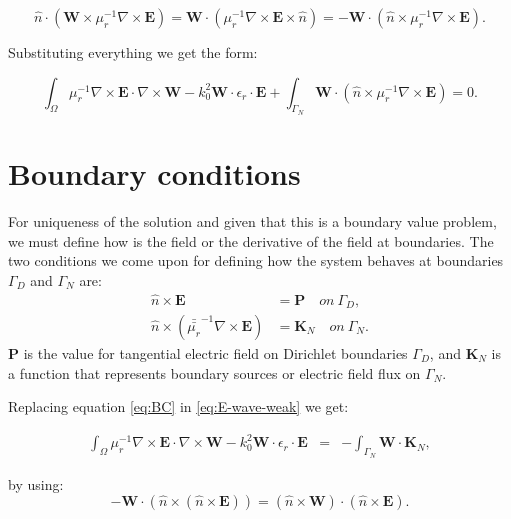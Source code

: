 $$\hat{n}\cdot
\left(\mathbf{W}\times\mu_r^{-1}
\nabla\times\mathbf{E}\right) =\mathbf{W} \cdot
 \left(\mu_r^{-1}\nabla\times\mathbf{E}\times\hat{n}\right) = -\mathbf{W} \cdot
 \left(\hat{n}\times\mu_r^{-1}
\nabla\times\mathbf{E}\right).$$

Substituting everything we get the form:

\begin{equation}
\int_{\Omega} \mu_r^{-1}\nabla\times \mathbf{E}\cdot \nabla\times\mathbf{W}
-k_0^{2}\mathbf{W}\cdot \epsilon_r\cdot \mathbf{E}
+ \int_{\Gamma_N} \mathbf{W} \cdot
 \left(\hat{n}\times\mu_r^{-1}
\nabla\times\mathbf{E}\right)
= 0. \label{eq:E-wave-weak} 
\end{equation}


\section{Boundary conditions}

For uniqueness of the solution and given that this is a boundary value problem, we must define how is the field or the derivative of the field at boundaries. The two conditions we come upon for defining how the system behaves at boundaries $\Gamma_D$ and $\Gamma_N$ are:
\begin{align}
\hat{n}\times\mathbf{E}&=\mathbf{P} \quad on \ \Gamma_D,\\
\hat{n}\times\left(\bar{\bar{\mu_r}}^{-1}
\nabla\times \mathbf{E}\right) &=\mathbf{K}_N \quad on \ \Gamma_N. \label{eq:BC}
\end{align}
$\mathbf{P}$ is the value for tangential electric field on Dirichlet boundaries $\Gamma_D$,  and $\mathbf{K}_N$ is a function that represents boundary sources or electric field flux on $\Gamma_N$.

Replacing equation \ref{eq:BC} in \ref{eq:E-wave-weak} we get:

\begin{equation}
\begin{array}{rcl}
\int_{\Omega} \mu_r^{-1}\nabla\times \mathbf{E}\cdot \nabla\times\mathbf{W}
-k_0^{2}\mathbf{W}\cdot\epsilon_r\cdot \mathbf{E}
&=& - \int_{\Gamma_N} \mathbf{W} \cdot\mathbf{K}_N,  \label{eq:E-wave-weak_3} 
\end{array}
\end{equation}

by using:
$$-\mathbf{W}\cdot\left(\hat{n}\times \left( \hat{n}\times 
\mathbf{E} \right)\right)  = \left(\hat{n}\times \mathbf{W}\right)\cdot\left( \hat{n}\times 
\mathbf{E} \right). $$



